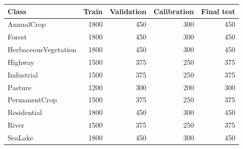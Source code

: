 \begin{tabular}{lrrrr}
\toprule
Class & Train & Validation & Calibration & Final test \\
\midrule
AnnualCrop & 1800 & 450 & 300 & 450 \\
Forest & 1800 & 450 & 300 & 450 \\
HerbaceousVegetation & 1800 & 450 & 300 & 450 \\
Highway & 1500 & 375 & 250 & 375 \\
Industrial & 1500 & 375 & 250 & 375 \\
Pasture & 1200 & 300 & 200 & 300 \\
PermanentCrop & 1500 & 375 & 250 & 375 \\
Residential & 1800 & 450 & 300 & 450 \\
River & 1500 & 375 & 250 & 375 \\
SeaLake & 1800 & 450 & 300 & 450 \\
\bottomrule
\end{tabular}
